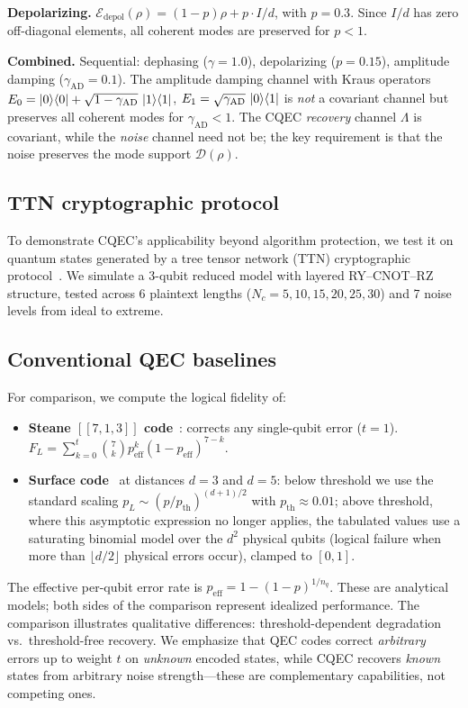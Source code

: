 \documentclass[a4paper,twocolumn]{quantumarticle}
\begin{document}
\textbf{Depolarizing.}
$\mathcal{E}_\mathrm{depol}(\rho) = (1-p)\rho + p \cdot I/d$, with $p = 0.3$.
Since $I/d$ has zero off-diagonal elements, all coherent modes are preserved for $p < 1$.

\textbf{Combined.}
Sequential: dephasing ($\gamma = 1.0$), depolarizing ($p = 0.15$), amplitude damping ($\gamma_\mathrm{AD} = 0.1$).
The amplitude damping channel with Kraus operators $E_0 = \ket{0}\!\bra{0} + \sqrt{1-\gamma_\mathrm{AD}}\,\ket{1}\!\bra{1}$, $E_1 = \sqrt{\gamma_\mathrm{AD}}\,\ket{0}\!\bra{1}$ is \emph{not} a covariant channel but preserves all coherent modes for $\gamma_\mathrm{AD} < 1$.
The CQEC \emph{recovery} channel $\Lambda$ is covariant, while the \emph{noise} channel need not be; the key requirement is that the noise preserves the mode support $\mathcal{D}(\rho)$.


\subsection{TTN cryptographic protocol}
\label{sec:ttn}

To demonstrate CQEC's applicability beyond algorithm protection, we test it on quantum states generated by a tree tensor network (TTN) cryptographic protocol~\cite{Huggins2019,Sim2019}.
We simulate a 3-qubit reduced model with layered RY--CNOT--RZ structure, tested across 6 plaintext lengths ($N_c = 5, 10, 15, 20, 25, 30$) and 7 noise levels from ideal to extreme.


\subsection{Conventional QEC baselines}
\label{sec:qec_baselines}

For comparison, we compute the logical fidelity of:
\begin{itemize}
\item \textbf{Steane $[\![7,1,3]\!]$ code}~\cite{Steane1996}: corrects any single-qubit error ($t = 1$). $F_L = \sum_{k=0}^{t} \binom{7}{k} p_\mathrm{eff}^k (1-p_\mathrm{eff})^{7-k}$.
\item \textbf{Surface code}~\cite{Kitaev2003,Fowler2012} at distances $d = 3$ and $d = 5$: below threshold we use the standard scaling $p_L \sim (p/p_\mathrm{th})^{(d+1)/2}$ with $p_\mathrm{th} \approx 0.01$; above threshold, where this asymptotic expression no longer applies, the tabulated values use a saturating binomial model over the $d^2$ physical qubits (logical failure when more than $\lfloor d/2 \rfloor$ physical errors occur), clamped to $[0, 1]$.
\end{itemize}
The effective per-qubit error rate is $p_\mathrm{eff} = 1 - (1-p)^{1/n_q}$.
These are analytical models; both sides of the comparison represent idealized performance.
The comparison illustrates qualitative differences: threshold-dependent degradation vs.\ threshold-free recovery.
We emphasize that QEC codes correct \emph{arbitrary} errors up to weight $t$ on \emph{unknown} encoded states, while CQEC recovers \emph{known} states from arbitrary noise strength---these are complementary capabilities, not competing ones.
\end{document}
